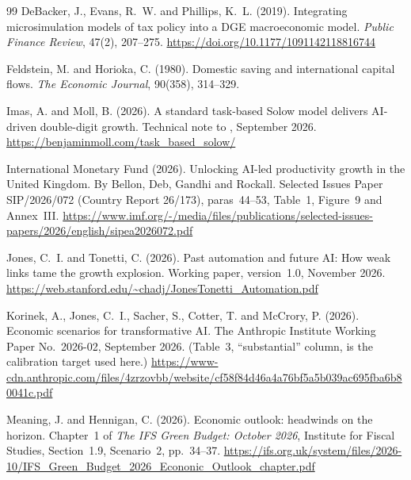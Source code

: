 \begin{thebibliography}{99}
DeBacker, J., Evans, R.~W. and Phillips, K.~L. (2019).
\newblock Integrating microsimulation models of tax policy into a DGE macroeconomic model.
\newblock \emph{Public Finance Review}, 47(2), 207--275.
\newblock \url{https://doi.org/10.1177/1091142118816744}

Feldstein, M. and Horioka, C. (1980).
\newblock Domestic saving and international capital flows.
\newblock \emph{The Economic Journal}, 90(358), 314--329.

Imas, A. and Moll, B. (2026).
\newblock A standard task-based Solow model delivers AI-driven double-digit growth.
\newblock Technical note to \citet{mollimas2026}, September 2026.
\newblock \url{https://benjaminmoll.com/task_based_solow/}

International Monetary Fund (2026).
\newblock Unlocking AI-led productivity growth in the United Kingdom.
\newblock By Bellon, Deb, Gandhi and Rockall. Selected Issues Paper SIP/2026/072 (Country Report 26/173), paras~44--53, Table~1, Figure~9 and Annex~III.
\newblock \url{https://www.imf.org/-/media/files/publications/selected-issues-papers/2026/english/sipea2026072.pdf}

Jones, C.~I. and Tonetti, C. (2026).
\newblock Past automation and future AI: How weak links tame the growth explosion.
\newblock Working paper, version~1.0, November 2026.
\newblock \url{https://web.stanford.edu/~chadj/JonesTonetti_Automation.pdf}

Korinek, A., Jones, C.~I., Sacher, S., Cotter, T. and McCrory, P. (2026).
\newblock Economic scenarios for transformative AI.
\newblock The Anthropic Institute Working Paper No.~2026-02, September 2026.
\newblock (Table~3, ``substantial'' column, is the calibration target used here.)
\newblock \url{https://www-cdn.anthropic.com/files/4zrzovbb/website/cf58f84d46a4a76bf5a5b039ac695fba6b80041c.pdf}

Meaning, J. and Hennigan, C. (2026).
\newblock Economic outlook: headwinds on the horizon.
\newblock Chapter~1 of \emph{The IFS Green Budget: October 2026}, Institute for Fiscal Studies, Section~1.9, Scenario~2, pp.~34--37.
\newblock \url{https://ifs.org.uk/system/files/2026-10/IFS_Green_Budget_2026_Econonic_Outlook_chapter.pdf}


\end{thebibliography}
